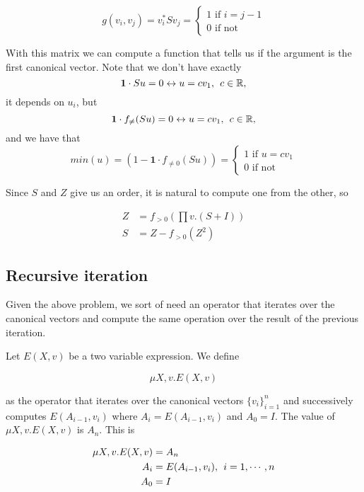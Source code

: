 \[
  			g(v_i, v_j)=v_i^*Sv_j=\begin{cases}
               1 \text{ if } i = j - 1 \\
               0 \text{ if not}
            \end{cases}
		\]
		
With this matrix we can compute a function that tells us if the argument is the first canonical vector. Note that we don't have exactly $$\mathbf{1}\cdot Su=0\leftrightarrow u=cv_1, \hspace{1ex} c\in\mathbb{R},$$ it depends on $u_i$, but  $$\mathbf{1}\cdot f_{\neq}(Su)=0\leftrightarrow u=cv_1, \hspace{1ex} c\in\mathbb{R},$$ and we have that
\[
  			min(u)=(1-\mathbf{1}\cdot f_{\neq 0}(Su))=\begin{cases}
               1 \text{ if } u = cv_1 \\
               0 \text{ if not}
            \end{cases}
		\]

Since $S$ and $Z$ give us an order, it is natural to compute one from the other, so

\begin{align*}
Z&=f_{>0}\left(\prod v. (S+I)\right) \\
S&=Z-f_{>0}(Z^2)
\end{align*}

\subsection*{Recursive iteration}

Given the above problem, we sort of need an operator that iterates over the canonical vectors and compute the same operation over the result of the previous iteration.

Let $E(X,v)$ be a two variable expression. We define

$$\mu X, v.E(X,v)$$

as the operator that iterates over the canonical vectors $\lbrace v_i\rbrace_{i=1}^n$ and successively computes $E(A_{i-1}, v_i)$ where $A_i=E(A_{i-1}, v_{i})$ and $A_0=I$. The value of $\mu X, v.E(X,v)$ is $A_n$. This is

\begin{align*}
\mu X, v.E(X,v)&=A_n \\
A_i&=E(A_{i-1}, v_{i}),\hspace{1ex}i=1,\cdots, n \\
A_0&=I
\end{align*}


